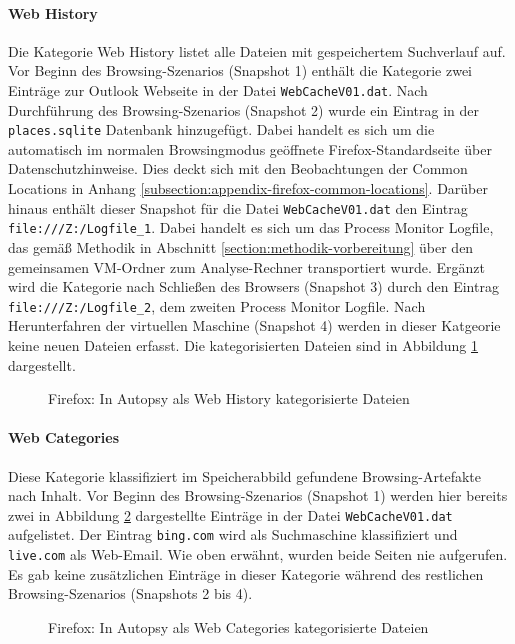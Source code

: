 \begin{appendices}
\paragraph*{Web History}
Die Kategorie \glqq{}Web History\grqq{} listet alle Dateien mit gespeichertem Suchverlauf auf. Vor Beginn des Browsing-Szenarios (Snapshot 1) enthält die Kategorie zwei Einträge zur Outlook Webseite in der Datei \texttt{WebCacheV01.dat}. Nach Durchführung des Browsing-Szenarios (Snapshot 2) wurde ein Eintrag in der \texttt{places.sqlite} Datenbank hinzugefügt. Dabei handelt es sich um die automatisch im normalen Browsingmodus geöffnete Firefox-Standardseite über Datenschutzhinweise. Dies deckt sich mit den Beobachtungen der Common Locations in Anhang \ref{subsection:appendix-firefox-common-locations}. Darüber hinaus enthält dieser Snapshot für die Datei \texttt{WebCacheV01.dat} den Eintrag \texttt{file:///Z:/Logfile\_1}. Dabei handelt es sich um das Process Monitor Logfile, das gemäß Methodik in Abschnitt \ref{section:methodik-vorbereitung} über den gemeinsamen VM-Ordner zum Analyse-Rechner transportiert wurde. Ergänzt wird die Kategorie nach Schließen des Browsers (Snapshot 3) durch den Eintrag \texttt{file:///Z:/Logfile\_2}, dem zweiten Process Monitor Logfile. Nach Herunterfahren der virtuellen Maschine (Snapshot 4) werden in dieser Katgeorie keine neuen Dateien erfasst. Die kategorisierten Dateien sind in Abbildung \ref{img:firefox-web-history} dargestellt.
\begin{figure}[h!]
	\centerline{}
	\caption{Firefox: In Autopsy als \glqq{}Web History\grqq{} kategorisierte Dateien}
	\label{img:firefox-web-history}  
\end{figure}

\paragraph*{Web Categories}
Diese Kategorie klassifiziert im Speicherabbild gefundene Browsing-Artefakte nach Inhalt.
Vor Beginn des Browsing-Szenarios (Snapshot 1) werden hier bereits zwei in Abbildung \ref{img:firefox-web-categories} dargestellte Einträge in der Datei \texttt{WebCacheV01.dat} aufgelistet. Der Eintrag \texttt{bing.com} wird als \glqq{}Suchmaschine\grqq{} klassifiziert und \texttt{live.com} als \glqq{}Web-Email\grqq{}.
Wie oben erwähnt, wurden beide Seiten nie aufgerufen. Es gab keine zusätzlichen Einträge in dieser Kategorie während des restlichen Browsing-Szenarios (Snapshots 2 bis 4).
\begin{figure}[h!]
	\centerline{}
	\caption{Firefox: In Autopsy als \glqq{}Web Categories\grqq{} kategorisierte Dateien}
	\label{img:firefox-web-categories}  
\end{figure}


\end{appendices}
